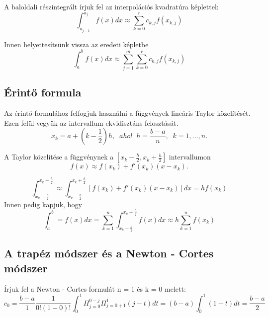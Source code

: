 \documentclass{article}
\theoremstyle{definition}
\theoremstyle{theorem}
\begin{document}
A baloldali részintegrált írjuk fel az interpolációs kvadratúra képlettel:
\begin{equation*}
\int_{a_{j-1}}^{a_j} f(x) dx \approx \sum_{k=0}^{r} c_{k,j}f(x_{k,j})
\end{equation*}

Innen helyettesítsünk vissza az eredeti képletbe
\begin{equation*}
\int_a^b f(x) dx \approx \sum_{j=1}^{m} \sum_{k=0}^{r} c_{k,j} f(x_{k,j})
\end{equation*}


\subsection{Érintő formula}

Az érintő formulához felfogjuk használni a függvények lineáris Taylor közelítését. Ezen felül vegyük az intervallum ekvidisztáns felosztását.
\begin{equation*}
   x_k = a + (k - \frac{1}{2})h ,\;\; ahol\;\; h = \frac{b-a}{n},\;\; k =1,...,n.
\end{equation*}



A Taylor közelítése a függvénynek a $[x_k-\frac{h}{2},x_k+\frac{h}{2}]$ intervallumon
\begin{equation*}
    f(x) \approx f(x_k)+f'(x_k)(x-x_k).
\end{equation*}

\begin{equation*}
\int_{x_k-\frac{h}{2}}^{x_k + \frac{h}{2}} \approx \int_{x_k - \frac{h}{2}}^{x_k + \frac{h}{2}} [f(x_k) + f'(x_k)(x-x_k)] dx = hf(x_k)
\end{equation*}
\newline
Innen pedig kapjuk, hogy
\begin{equation*}
\int_a^b = f(x) dx = \sum_{k=1}^n \int_{x_k - \frac{h}{2}}^{x_k + \frac{h}{2}} f(x)dx \approx h \sum_{k=1}^n f(x_k)
\end{equation*}



\subsection{A trapéz módszer és a Newton - Cortes módszer}
Írjuk fel a Newton - Cortes formulát n = 1 és k = 0 melett:
\begin{equation*}
c_0 = \frac{b-a}{1} \frac{1}{0!(1-0)!} \int_0^{1} \Pi_{j=0}^{0-j} \Pi_{j=0+1}^{1} (j-t) dt = (b-a) \int_0^1 (1-t) dt = \frac{b-a}{2}
\end{equation*}
\end{document}
